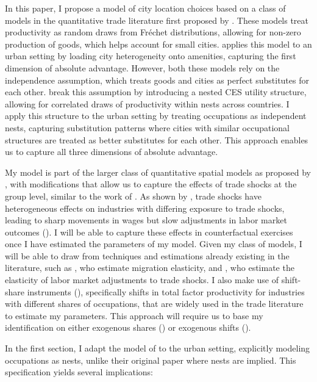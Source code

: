 \documentclass[10pt]{article}
\begin{document}
In this paper, I propose a model of city location choices based on a class of models in the quantitative trade literature first proposed by \cite{ek}. These models treat productivity as random draws from Fr\'{e}chet distributions, allowing for non-zero production of goods, which helps account for small cities. \cite{redding} applies this model to an urban setting by loading city heterogeneity onto amenities, capturing the first dimension of absolute advantage. However, both these models rely on the independence assumption, which treats goods and cities as perfect substitutes for each other. \cite{lindandramondo} break this assumption by introducing a nested CES utility structure, allowing for correlated draws of productivity within nests across countries. I apply this structure to the urban setting by treating occupations as independent nests, capturing substitution patterns where cities with similar occupational structures are treated as better substitutes for each other. This approach enables us to capture all three dimensions of absolute advantage.

My model is part of the larger class of quantitative spatial models as proposed by \cite{redding2017}, with modifications that allow us to capture the effects of trade shocks at the group level, similar to the work of \cite{galle2023}. As shown by \cite{adh2013}, trade shocks have heterogeneous effects on industries with differing exposure to trade shocks, leading to sharp movements in wages but slow adjustments in labor market outcomes (\cite{acm2010}). I will be able to capture these effects in counterfactual exercises once I have estimated the parameters of my model. Given my class of models, I will be able to draw from techniques and estimations already existing in the literature, such as \cite{albert_monras2022}, who estimate migration elasticity, and \cite{kim_vogel2020}, who estimate the elasticity of labor market adjustments to trade shocks. I also make use of shift-share instruments (\cite{bartik1991}), specifically shifts in total factor productivity for industries with different shares of occupations, that are widely used in the trade literature to estimate my parameters. This approach will require us to base my identification on either exogenous shares (\cite{pssh2020}) or exogenous shifts (\cite{bhj2020}).

In the first section, I adapt the model of \cite{lindandramondo} to the urban setting, explicitly modeling occupations as nests, unlike their original paper where nests are implied. This specification yields several implications:
\end{document}

